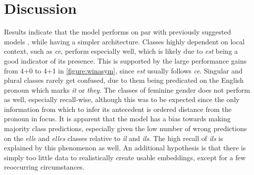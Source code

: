 \documentclass[11pt]{article}
\begin{document}
\begin{table}[t]
    \caption{Confusion matrix of class predictions. Row signifies actual class according to gold standard, while column represents predicted class according to the classifier.}
    \label{tbl:confmatrix}
\end{table}

\section{Discussion}

Results indicate that the model performs on par with previously suggested models \cite{Hardmeier2013Latent}, while having a simpler architecture.
Classes highly dependent on local context, such as \emph{ce}, perform especially well, which is likely due to \emph{est} being a good indicator of its presence.
This is supported by the large performance gains from 4+0 to 4+1 in \cref{figure:winasym}, since \emph{est} usually follows \emph{ce}.
Singular and plural classes rarely get confused, due to them being predicated on the English pronoun which marks \emph{it} or \emph{they}.
The classes of feminine gender does not perform as well, especially recall-wise, although this was to be expected since the only information from which to infer its antecedent is ordered distance from the pronoun in focus.
It is apparent that the model has a bias towards making majority class predictions, especially given the low number of wrong predictions on the \emph{elle} and \emph{elles} classes relative to \emph{il} and \emph{ils}.
The high recall of \emph{ils} is explained by this phenomenon as well.
An additional hypothesis is that there is simply too little data to realistically create usable embeddings, except for a few reoccurring circumstances.
\end{document}
